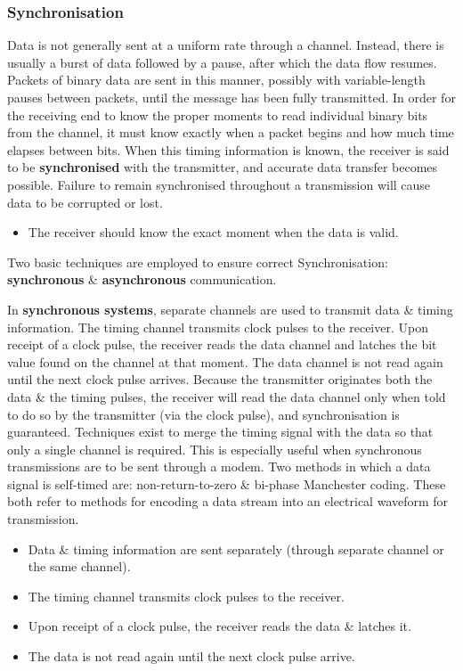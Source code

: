 \documentclass[11pt]{article}
\begin{document}
\subsubsection{Synchronisation}
Data is not generally sent at a uniform rate through a channel. 
Instead, there is usually a burst of data followed by a pause, after which the data flow resumes. 
Packets of binary data are sent in this manner, possibly  with variable-length pauses between packets, until the message has been 
fully transmitted. 
In order for the receiving end to know the proper moments to read individual binary bits from the channel, it must know exactly when 
a packet begins and how much time elapses between bits. 
When this timing information is known, the receiver is said to be \textbf{synchronised} with the transmitter, and accurate data 
transfer becomes possible. 
Failure to remain synchronised throughout a transmission will cause data to be corrupted or lost. 
\begin{itemize}
    \item The receiver should know the exact moment when the data is valid. 
\end{itemize}

Two basic techniques are employed to ensure correct Synchronisation: \textbf{synchronous} \& \textbf{asynchronous} communication. 

In \textbf{synchronous systems}, separate channels are used to transmit data \& timing information. 
The timing channel transmits clock pulses to the receiver. 
Upon receipt of a clock pulse, the receiver reads the data channel and latches the bit value found on the channel at that moment. 
The data channel is not read again until the next clock pulse arrives. 
Because the transmitter originates both the data \& the timing pulses, the receiver will read the data channel only when told 
to do so by the transmitter (via the clock pulse), and synchronisation is guaranteed. 
Techniques exist to merge the timing signal with the data so that only a single channel is required. 
This is especially useful when synchronous transmissions are to be sent through a modem. 
Two methods in which a data signal is self-timed are: non-return-to-zero \& bi-phase Manchester coding. 
These both refer to methods for encoding a data stream into an electrical waveform for transmission. 
\begin{itemize}
    \item Data \& timing information are sent separately (through separate channel or the same channel). 
    \item The timing channel transmits clock pulses to the receiver. 
    \item Upon receipt of a clock pulse, the receiver reads the data \& latches it. 
    \item The data is not read again until the next clock pulse arrive. 
\end{itemize}
\end{document}
